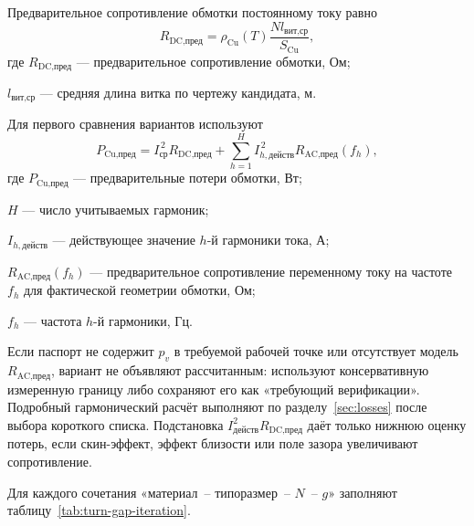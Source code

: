 \documentclass[14pt,a4paper]{extarticle}
\begin{document}
Предварительное сопротивление обмотки постоянному току равно
\begin{equation}
 R_{\text{DC,пред}}=
 \rho_{\text{Cu}}(T)
 \frac{N l_{\text{вит,ср}}}{S_{\text{Cu}}},
 \label{eq:rdc-preliminary}
\end{equation}
где $R_{\text{DC,пред}}$ --- предварительное сопротивление обмотки, Ом;\par\noindent
$l_{\text{вит,ср}}$ --- средняя длина витка по чертежу кандидата, м.

Для первого сравнения вариантов используют
\begin{equation}
 P_{\text{Cu,пред}}=
 I_{\text{ср}}^{\,2}R_{\text{DC,пред}}
 +\sum_{h=1}^{H}
 I_{h,\text{действ}}^{\,2}
 R_{\text{AC,пред}}(f_h),
 \label{eq:copper-loss-preliminary}
\end{equation}
где $P_{\text{Cu,пред}}$ --- предварительные потери обмотки, Вт;\par\noindent
$H$ --- число учитываемых гармоник;\par\noindent
$I_{h,\text{действ}}$ --- действующее значение $h$-й гармоники тока,
А;\par\noindent
$R_{\text{AC,пред}}(f_h)$ --- предварительное сопротивление переменному
току на частоте $f_h$ для фактической геометрии обмотки, Ом;\par\noindent
$f_h$ --- частота $h$-й гармоники, Гц.

Если паспорт не содержит $p_v$ в требуемой рабочей точке или отсутствует
модель $R_{\text{AC,пред}}$, вариант не объявляют рассчитанным: используют
консервативную измеренную границу либо сохраняют его как
«требующий верификации». Подробный гармонический расчёт выполняют по
разделу~\ref{sec:losses} после выбора короткого списка. Подстановка
$I_{\text{действ}}^2R_{\text{DC,пред}}$ даёт только нижнюю оценку потерь,
если скин-эффект, эффект близости или поле зазора увеличивают сопротивление.

Для каждого сочетания «материал~-- типоразмер~-- $N$~-- $g$»
заполняют таблицу~\ref{tab:turn-gap-iteration}.
\end{document}
